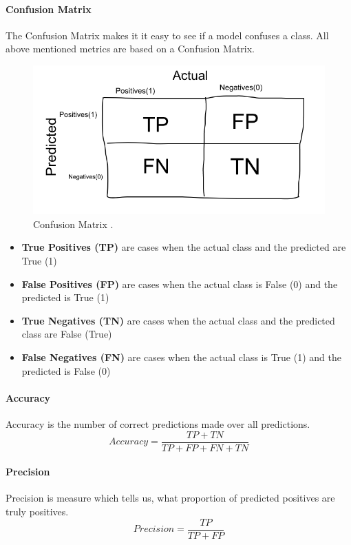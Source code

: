 \documentclass{article}
\begin{document}
\paragraph{Confusion Matrix} The Confusion Matrix makes it it easy to see if a model confuses a class. All above mentioned metrics are based on a Confusion Matrix.
\begin{figure}[h]
    \centering
    \includegraphics[scale=0.35]{./images/confusion_matrix}
    \caption{Confusion Matrix \cite{metrics}.}
    \label{fig:confusion_matrix}
\end{figure}
\begin{itemize}
    \item \textbf{True Positives (TP)} are cases when the actual class and the predicted are True (1)
    \item \textbf{False Positives (FP)} are cases when the actual class is False (0) and the predicted is True (1)
    \item \textbf{True Negatives (TN)} are cases when the actual class and the predicted class are False (True)
    \item \textbf{False Negatives (FN)} are cases when the actual class  is True (1) and the predicted is False (0)
\end{itemize}

\paragraph{Accuracy} Accuracy is the number of correct predictions made over all predictions.
\begin{equation}
Accuracy = \frac{TP + TN}{TP + FP + FN + TN}
\end{equation}

\paragraph{Precision} Precision is measure which tells us, what proportion of predicted positives are truly positives.
\begin{equation}
Precision = \frac{TP}{TP + FP}
\end{equation}
\end{document}
